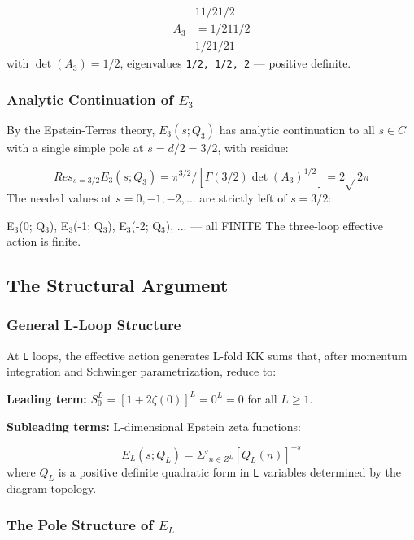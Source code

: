 \documentclass[aps,prd,preprint,superscriptaddress,longbibliography,floatfix]{revtex4-2}
\theoremstyle{remark}
\begin{document}
\begin{align}
    &   1   1/2  1/2  \\
    A_{3} &=  1/2   1   1/2  \\
    &  1/2  1/2   1  
\end{align}
with $\det(A_{3}) = 1/2$, eigenvalues \texttt{1/2, 1/2, 2} --- positive definite.


\subsubsection{Analytic Continuation of $E_{3}$}

By the Epstein-Terras theory, $E_{3}(s; Q_{3})$ has analytic continuation to all $s \in C$ with a single simple pole at $s = d/2 = 3/2$, with residue:


\begin{equation}
    Res_{s=3/2} E_{3}(s; Q_{3}) = \pi^{3/2} / [\Gamma(3/2) \det(A_{3})^{1/2}] = 2\sqrt{}2 \pi
\end{equation}
The needed values at $s = 0, -1, -2, ...$ are strictly left of $s = 3/2$:


E$_{3}$(0; Q$_{3}$), E$_{3}$(-1; Q$_{3}$), E$_{3}$(-2; Q$_{3}$), ... --- all FINITE
The three-loop effective action is finite.



\subsection{The Structural Argument}


\subsubsection{General L-Loop Structure}

At \texttt{L} loops, the effective action generates L-fold KK sums that, after momentum integration and Schwinger parametrization, reduce to:

\textbf{Leading term:} $S_{0}^L = [1 + 2\zeta(0)]^L = 0^L = 0$ for all $L \geq 1$.

\textbf{Subleading terms:} L-dimensional Epstein zeta functions:


\begin{equation}
    E_L(s; Q_L) = \Sigma'_{n \in Z^L} [Q_L(n)]^{-s}
\end{equation}
where $Q_L$ is a positive definite quadratic form in \texttt{L} variables determined by the diagram topology.


\subsubsection{The Pole Structure of $E_L$}
\end{document}
